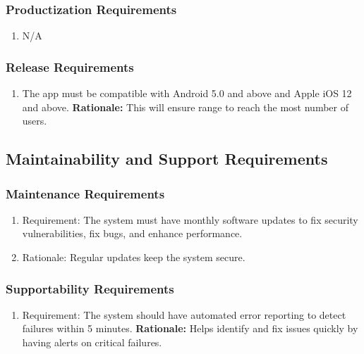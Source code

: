 \documentclass[]{article}
\begin{document}
\subsubsection{Productization Requirements}
\label{ssub:productization_requirements}
\begin{enumerate}[{OE-P}1. ]
	\item N/A
\end{enumerate}

\subsubsection{Release Requirements}
\label{ssub:release_requirements}
\begin{enumerate}[{OE-R}1. ]
	\item The app must be compatible with Android 5.0 and above and Apple iOS 12 and above.
    \newline \textbf{ Rationale: } This will ensure range to reach the most number of users. 
\end{enumerate}
\subsection{Maintainability and Support Requirements} \label{sub:maintainability_and_support_requirements} %
\subsubsection{Maintenance Requirements} \label{ssub:maintenance_requirements} 
 \begin{enumerate}[{MS-M}1. ] \item Requirement: The system must have monthly software updates to fix security vulnerabilities, fix bugs, and enhance performance. \item Rationale: Regular updates keep the system secure. \end{enumerate} %
\subsubsection{Supportability Requirements} \label{ssub:supportability_requirements}
\begin{enumerate}[{MS-S}1. ] \item Requirement: The system should have automated error reporting to detect failures within 5 minutes. 
    \newline \textbf{Rationale:} Helps identify and fix issues quickly by having alerts on critical failures. \end{enumerate} %
\end{document}
